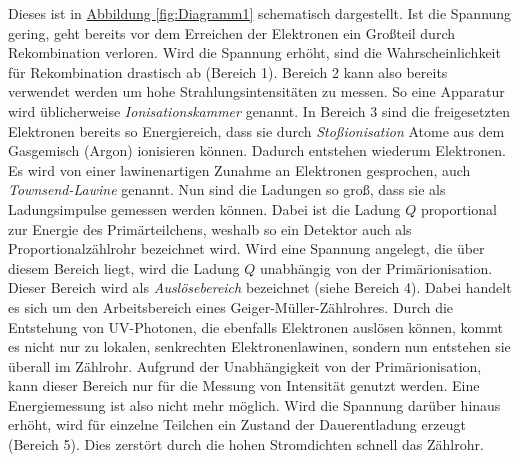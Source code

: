 Dieses ist in \hyperref[fig:Diagramm1]{Abbildung \ref{fig:Diagramm1}} schematisch dargestellt.
Ist die Spannung gering, geht bereits vor dem Erreichen der Elektronen ein Großteil durch Rekombination verloren.
Wird die Spannung erhöht, sind die Wahrscheinlichkeit für Rekombination drastisch ab (Bereich 1).
Bereich 2 kann also bereits verwendet werden um hohe Strahlungsintensitäten zu messen.
So eine Apparatur wird üblicherweise \textit{Ionisationskammer} genannt.
In Bereich 3 sind die freigesetzten Elektronen bereits so Energiereich, dass sie durch \textit{Stoßionisation} Atome aus dem Gasgemisch (Argon)
ionisieren können. Dadurch entstehen wiederum Elektronen.
Es wird von einer lawinenartigen Zunahme an Elektronen gesprochen, auch \textit{Townsend-Lawine} genannt.
Nun sind die Ladungen so groß, dass sie als Ladungsimpulse gemessen werden können.
Dabei ist die Ladung $Q$ proportional zur Energie des Primärteilchens, weshalb so ein Detektor auch als Proportionalzählrohr bezeichnet wird.
Wird eine Spannung angelegt, die über diesem Bereich liegt, wird die Ladung $Q$ unabhängig von der Primärionisation.
Dieser Bereich wird als \textit{Auslösebereich} bezeichnet (siehe Bereich 4).
Dabei handelt es sich um den Arbeitsbereich eines Geiger-Müller-Zählrohres.
Durch die Entstehung von UV-Photonen, die ebenfalls Elektronen auslösen können, kommt es nicht nur zu lokalen,
senkrechten Elektronenlawinen, sondern nun entstehen sie überall im Zählrohr.
Aufgrund der Unabhängigkeit von der Primärionisation, kann dieser Bereich nur für die Messung von Intensität genutzt werden.
Eine Energiemessung ist also nicht mehr möglich.
Wird die Spannung darüber hinaus erhöht, wird für einzelne Teilchen ein Zustand der Dauerentladung erzeugt (Bereich 5).
Dies zerstört durch die hohen Stromdichten schnell das Zählrohr.

